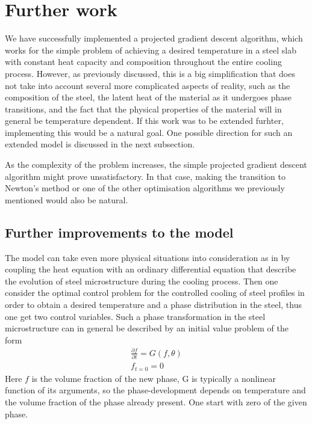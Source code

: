 \section{Further work}

We have successfully implemented a projected gradient descent algorithm, which works for the simple problem of achieving a desired temperature in a steel slab with constant heat capacity and composition throughout the entire cooling process. However, as previously discussed, this is a big simplification that does not take into account several more complicated aspects of reality, such as the composition of the steel, the latent heat of the material as it undergoes phase transitions, and the fact that the physical properties of the material will in general be temperature dependent. If this work was to be extended furhter, implementing this would be a natural goal. One possible direction for such an extended model is discussed in the next subsection.

As the complexity of the problem increases, the simple projected gradient descent algorithm might prove unsatisfactory. In that case, making the transition to Newton's method or one of the other optimisation algorithms we previously mentioned would also be natural.

\subsection{Further improvements to the model}
The model can take even more physical situations into consideration as in \cite{DPSteelOverview} by coupling the  heat equation with an ordinary differential equation that describe the evolution of steel microstructure during the cooling process. Then one consider the optimal control problem for the controlled cooling of steel profiles in order to obtain a desired temperature and a phase distribution in the steel, thus one get two control variables. Such a phase transformation in the steel microstructure can in general be described by an initial value problem of the form 
\begin{align*}
    \frac{\partial f}{\partial t} = G(f,\theta ) \\
    f_{t=0} = 0
\end{align*}
Here $f$ is the volume fraction of the new phase, G is typically a nonlinear function of its arguments, so the phase-development depends on temperature and the volume fraction of the phase already present. One start with zero of the given phase. 

